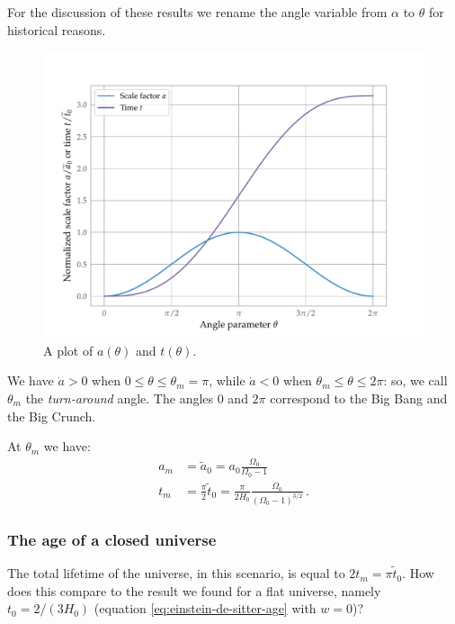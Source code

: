 \documentclass[main.tex]{subfiles}
\begin{document}
For the discussion of these results we rename the angle variable from \(\alpha \) to \(\theta \) for historical reasons. 
\begin{figure}[ht]
\centering
\includegraphics[width=\textwidth]{figures/positive_curvature_a.pdf}
\caption{A plot of \(a(\theta )\) and \(t(\theta )\).}
\label{fig:positive_curvature_a}
\end{figure}

We have \(\dot{a} > 0 \)   when \(0 \leq \theta \leq \theta_m = \pi \), while \(\dot{a} < 0\) when \(\theta _m \leq \theta \leq 2 \pi \): so, we call \(\theta_{m}\) the \emph{turn-around} angle.
The angles \(0\) and \(2 \pi \) correspond to the Big Bang and the Big Crunch.

At \(\theta _m\) we have: 
%
\begin{align}
  a_m &= \widetilde{a}_{0} =  a_0 \frac{\Omega_0}{\Omega_0 -1}  \\
  t_m &= \frac{\pi}{2} \widetilde{t}_0 = \frac{\pi}{2 H_0 } \frac{\Omega_0}{(\Omega_0 -1)^{3/2}}
\,.
\end{align}

\subsubsection{The age of a closed universe}

The total lifetime of the universe, in this scenario, is equal to \(2 t_m = \pi \widetilde{t}_{0}\). How does this compare to the result we found for a flat universe, namely \(t_0 = 2 / (3 H_0 )\) (equation \eqref{eq:einstein-de-sitter-age} with \(w=0\))?
\end{document}
